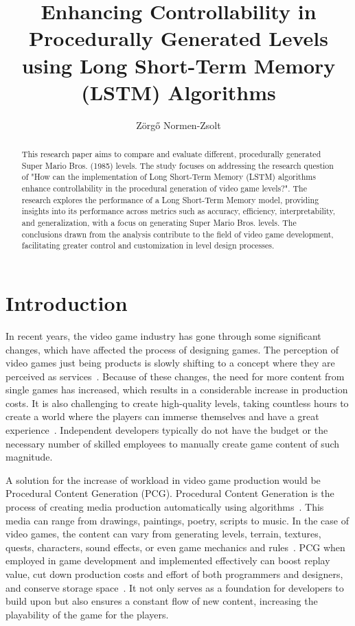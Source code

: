 \documentclass[runningheads]{llncs}
\title{Enhancing Controllability in Procedurally Generated Levels using Long Short-Term Memory (LSTM) Algorithms}
\author{Zörgő Normen-Zsolt}
\institute{Babeș-Bolyai University, Faculty of Economics and Business Administration (FSEGA), Cluj Napoca CJ, Romania}
\begin{document}
\maketitle


\begin{abstract}
This research paper aims to compare and evaluate different, procedurally generated Super Mario Bros. (1985) levels. The study focuses on addressing the research question of "How can the implementation of Long Short-Term Memory (LSTM) algorithms enhance controllability in the procedural generation of video game levels?". The research explores the performance of a Long Short-Term Memory model, providing insights into its performance across metrics such as accuracy, efficiency, interpretability, and generalization, with a focus on generating Super Mario Bros. levels. The conclusions drawn from the analysis contribute to the field of video game development, facilitating greater control and customization in level design processes.

\end{abstract}


\section{Introduction}
In recent years, the video game industry has gone through some significant changes, which have affected the process of designing games. The perception of video games just being products is slowly shifting to a concept where they are perceived as services~\cite{ref_article1}. Because of these changes, the need for more content from single games has increased, which results in a considerable increase in production costs. It is also challenging to create high-quality levels, taking countless hours to create a world where the players can immerse themselves and have a great experience~\cite{ref_article2}. Independent developers typically do not have the budget or the necessary number of skilled employees to manually create game content of such magnitude.

A solution for the increase of workload in video game production would be Procedural Content Generation (PCG). Procedural Content Generation is the process of creating media production automatically using algorithms~\cite{ref_article3}. This media can range from drawings, paintings, poetry, scripts to music. In the case of video games, the content can vary from generating levels, terrain, textures, quests, characters, sound effects, or even game mechanics and rules~\cite{ref_article4}. PCG when employed in game development and implemented effectively can boost replay value, cut down production costs and effort of both programmers and designers, and conserve storage space~\cite{ref_article5}. It not only serves as a foundation for developers to build upon but also ensures a constant flow of new content, increasing the playability of the game for the players.
\end{document}
